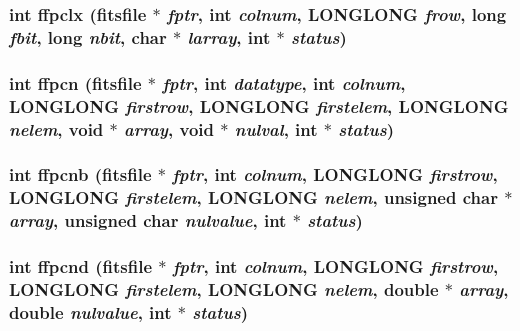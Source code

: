 \subsubsection{\setlength{\rightskip}{0pt plus 5cm}int ffpclx (\bf{fitsfile} $\ast$ {\em fptr}, int {\em colnum}, \bf{LONGLONG} {\em frow}, long {\em fbit}, long {\em nbit}, char $\ast$ {\em larray}, int $\ast$ {\em status})}\label{test_2shm__client_2fitsio_8h_36824bfe44a4dbdee167ea243384cab2}


\subsubsection{\setlength{\rightskip}{0pt plus 5cm}int ffpcn (\bf{fitsfile} $\ast$ {\em fptr}, int {\em datatype}, int {\em colnum}, \bf{LONGLONG} {\em firstrow}, \bf{LONGLONG} {\em firstelem}, \bf{LONGLONG} {\em nelem}, void $\ast$ {\em array}, void $\ast$ {\em nulval}, int $\ast$ {\em status})}\label{test_2shm__client_2fitsio_8h_a062602b8a804f46be72152477dc2321}


\subsubsection{\setlength{\rightskip}{0pt plus 5cm}int ffpcnb (\bf{fitsfile} $\ast$ {\em fptr}, int {\em colnum}, \bf{LONGLONG} {\em firstrow}, \bf{LONGLONG} {\em firstelem}, \bf{LONGLONG} {\em nelem}, unsigned char $\ast$ {\em array}, unsigned char {\em nulvalue}, int $\ast$ {\em status})}\label{test_2shm__client_2fitsio_8h_52e1f7ec25307939c85af2e5ab92fe5f}


\subsubsection{\setlength{\rightskip}{0pt plus 5cm}int ffpcnd (\bf{fitsfile} $\ast$ {\em fptr}, int {\em colnum}, \bf{LONGLONG} {\em firstrow}, \bf{LONGLONG} {\em firstelem}, \bf{LONGLONG} {\em nelem}, double $\ast$ {\em array}, double {\em nulvalue}, int $\ast$ {\em status})}\label{test_2shm__client_2fitsio_8h_521f9cb2a81ba66277d032513255e1f6}


